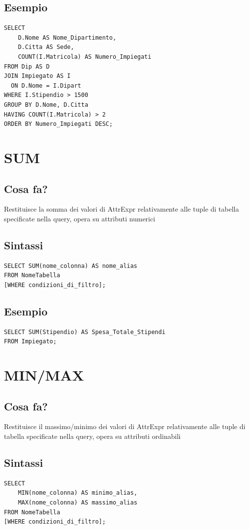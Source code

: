 \subsection{Esempio}
\begin{lstlisting}[language=sql_generic]
SELECT 
    D.Nome AS Nome_Dipartimento,
    D.Citta AS Sede,
    COUNT(I.Matricola) AS Numero_Impiegati
FROM Dip AS D
JOIN Impiegato AS I 
  ON D.Nome = I.Dipart
WHERE I.Stipendio > 1500
GROUP BY D.Nome, D.Citta
HAVING COUNT(I.Matricola) > 2
ORDER BY Numero_Impiegati DESC;
\end{lstlisting}

\section{SUM}
\subsection{Cosa fa?}
Restituisce la somma dei valori di AttrExpr relativamente alle tuple di tabella specificate nella query, opera su attributi numerici
\subsection{Sintassi}
\begin{lstlisting}[language=sql_generic]
SELECT SUM(nome_colonna) AS nome_alias
FROM NomeTabella
[WHERE condizioni_di_filtro];
\end{lstlisting}
\subsection{Esempio}
\begin{lstlisting}[language=sql_generic]
SELECT SUM(Stipendio) AS Spesa_Totale_Stipendi
FROM Impiegato;
\end{lstlisting}

\section{MIN/MAX}
\subsection{Cosa fa?}
Restituisce il massimo/minimo dei valori di AttrExpr relativamente alle tuple di tabella specificate nella query, opera su attributi  ordinabili
\subsection{Sintassi}
\begin{lstlisting}[language=sql_generic]
SELECT 
    MIN(nome_colonna) AS minimo_alias,
    MAX(nome_colonna) AS massimo_alias
FROM NomeTabella
[WHERE condizioni_di_filtro];
\end{lstlisting}
